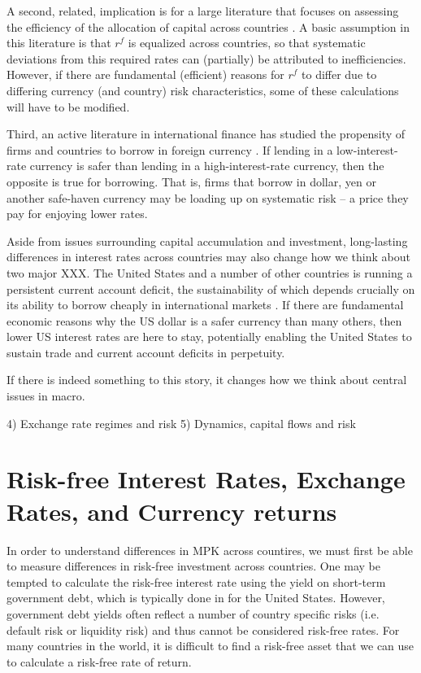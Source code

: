 \documentclass[12pt,letter]{article}
\theoremstyle{break} \theorembodyfont{\normalfont\itshape}
\theoremstyle{break}
\theoremstyle{break} \theorembodyfont{\normalfont\itshape}
\theoremstyle{break} \theorembodyfont{\normalfont\itshape}
\begin{document}
A second, related, implication is for a large literature that focuses
on assessing the efficiency of the allocation of capital across
countries \citep{HallJones1997, CaselliFeyrer2007}. A basic assumption
in this literature is that $r^f$ is equalized across countries, so
that systematic deviations from this required rates can (partially) be
attributed to inefficiencies. However, if there are fundamental
(efficient) reasons for $r^f$ to differ due to differing currency (and
country) risk characteristics, some of these calculations will have to
be modified.

Third, an active literature in international finance has studied the
propensity of firms and countries to borrow in foreign currency
\citep{DuSchreger2016, KalemliOzcanetal2019}. If lending in a
low-interest-rate currency is safer than lending in a
high-interest-rate currency, then the opposite is true for borrowing.
That is, firms that borrow in dollar, yen or another safe-haven
currency may be loading up on systematic risk -- a price they pay for
enjoying lower rates.

Aside from issues surrounding capital accumulation and investment,
long-lasting differences in interest rates across countries may also
change how we think about two major XXX. The United States and a
number of other countries is running a persistent current account
deficit, the sustainability of which depends crucially on its ability
to borrow cheaply in international markets \citep{GourinchasRey2007}.
If there are fundamental economic reasons why the US dollar is a safer
currency than many others, then lower US interest rates are here to
stay, potentially enabling the United States to sustain trade and
current account deficits in perpetuity.

If there is indeed something to this story, it changes how we think
about central issues in macro.

4) Exchange rate regimes and risk 5) Dynamics, capital flows and risk


\section{Risk-free Interest Rates, Exchange Rates, and Currency
  returns}

In order to understand differences in MPK across countires, we must 
first be able to measure differences in risk-free investment across 
countries. One may be tempted to calculate the risk-free 
interest rate using the yield on short-term government debt, which is 
typically done in for the United States. However, government debt yields 
often reflect a number of country specific risks (i.e. default risk or
liquidity risk) and thus cannot be considered risk-free rates. For 
many countries in the world, it is difficult to find a risk-free asset 
that we can use to calculate a risk-free rate of return.
\end{document}
